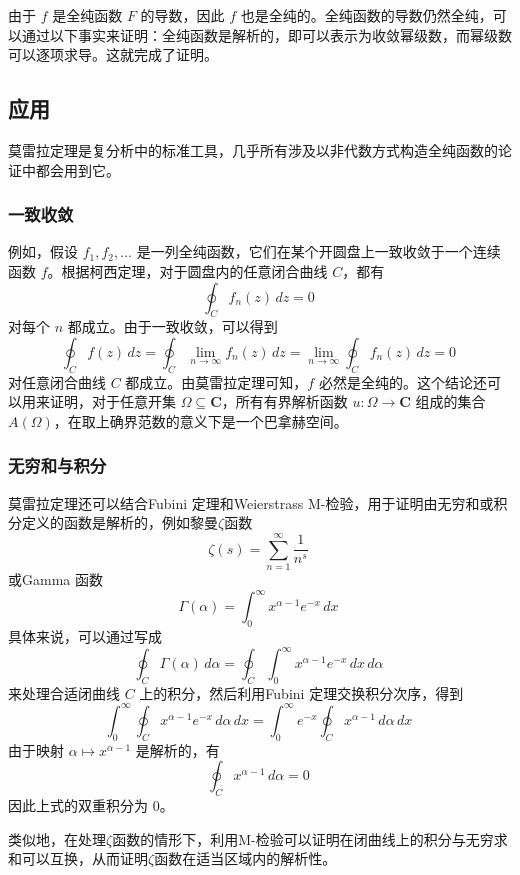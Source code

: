 由于 $f$ 是全纯函数 $F$ 的导数，因此 $f$ 也是全纯的。全纯函数的导数仍然全纯，可以通过以下事实来证明：全纯函数是解析的，即可以表示为收敛幂级数，而幂级数可以逐项求导。这就完成了证明。
\subsection{应用}
莫雷拉定理是复分析中的标准工具，几乎所有涉及以非代数方式构造全纯函数的论证中都会用到它。
\subsubsection{一致收敛}
例如，假设 $f_1, f_2, \dots$ 是一列全纯函数，它们在某个开圆盘上一致收敛于一个连续函数 $f$。根据柯西定理，对于圆盘内的任意闭合曲线 $C$，都有
$$
\oint_{C} f_n(z)\,dz = 0~
$$
对每个 $n$ 都成立。由于一致收敛，可以得到
$$
\oint_{C} f(z)\,dz
= \oint_{C} \lim_{n \to \infty} f_n(z)\,dz
= \lim_{n \to \infty} \oint_{C} f_n(z)\,dz
= 0~
$$
对任意闭合曲线 $C$ 都成立。由莫雷拉定理可知，$f$ 必然是全纯的。这个结论还可以用来证明，对于任意开集 $\Omega \subseteq \mathbf{C}$，所有有界解析函数 $u: \Omega \to \mathbf{C}$ 组成的集合 $A(\Omega)$，在取上确界范数的意义下是一个巴拿赫空间。
\subsubsection{无穷和与积分}
莫雷拉定理还可以结合Fubini 定理和Weierstrass M-检验，用于证明由无穷和或积分定义的函数是解析的，例如黎曼$\zeta$函数
$$
\zeta(s) = \sum_{n=1}^{\infty} \frac{1}{n^s}~
$$
或Gamma 函数
$$
\Gamma(\alpha) = \int_0^{\infty} x^{\alpha - 1} e^{-x} \, dx~
$$
具体来说，可以通过写成
$$
\oint_C \Gamma(\alpha) \, d\alpha
= \oint_C \int_0^{\infty} x^{\alpha - 1} e^{-x} \, dx \, d\alpha~
$$
来处理合适闭曲线 $C$ 上的积分，然后利用Fubini 定理交换积分次序，得到
$$
\int_0^{\infty} \oint_C x^{\alpha - 1} e^{-x} \, d\alpha \, dx
= \int_0^{\infty} e^{-x} \oint_C x^{\alpha - 1} \, d\alpha \, dx~
$$
由于映射 $\alpha \mapsto x^{\alpha - 1}$ 是解析的，有
$$
\oint_C x^{\alpha - 1} \, d\alpha = 0~
$$
因此上式的双重积分为 0。

类似地，在处理$\zeta$函数的情形下，利用M-检验可以证明在闭曲线上的积分与无穷求和可以互换，从而证明$\zeta$函数在适当区域内的解析性。
